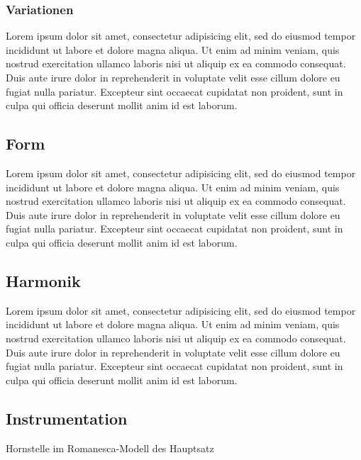 \subsubsection{Variationen}

Lorem ipsum dolor sit amet, consectetur adipisicing elit, sed do eiusmod tempor incididunt ut labore et dolore magna aliqua. Ut enim ad minim veniam, quis nostrud exercitation ullamco laboris nisi ut aliquip ex ea commodo consequat. Duis aute irure dolor in reprehenderit in voluptate velit esse cillum dolore eu fugiat nulla pariatur. Excepteur sint occaecat cupidatat non proident, sunt in culpa qui officia deserunt mollit anim id est laborum.


\subsection{Form}

Lorem ipsum dolor sit amet, consectetur adipisicing elit, sed do eiusmod tempor incididunt ut labore et dolore magna aliqua. Ut enim ad minim veniam, quis nostrud exercitation ullamco laboris nisi ut aliquip ex ea commodo consequat. Duis aute irure dolor in reprehenderit in voluptate velit esse cillum dolore eu fugiat nulla pariatur. Excepteur sint occaecat cupidatat non proident, sunt in culpa qui officia deserunt mollit anim id est laborum.


\subsection{Harmonik}

Lorem ipsum dolor sit amet, consectetur adipisicing elit, sed do eiusmod tempor incididunt ut labore et dolore magna aliqua. Ut enim ad minim veniam, quis nostrud exercitation ullamco laboris nisi ut aliquip ex ea commodo consequat. Duis aute irure dolor in reprehenderit in voluptate velit esse cillum dolore eu fugiat nulla pariatur. Excepteur sint occaecat cupidatat non proident, sunt in culpa qui officia deserunt mollit anim id est laborum.



\subsection{Instrumentation}

Hornstelle im Romanesca-Modell des Hauptsatz
